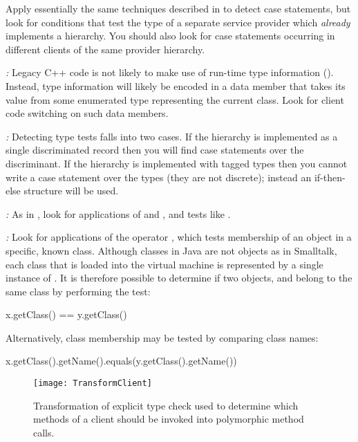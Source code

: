 \documentclass[a4paper,10pt,twoside]{book}
\begin{document}
Apply essentially the same techniques described in  to detect case statements, but look for conditions that test the type of a separate service provider which \emph{already} implements a hierarchy. You should also look for case statements occurring in different clients of the same provider hierarchy.

\begin{bulletlist}
\item \emph{:}
Legacy C++ code is not likely to make use of run-time type information (). Instead, type information will likely be encoded in a data member that takes its value from some enumerated type representing the current class. Look for client code switching on such data members.

\item \emph{:}
Detecting type tests falls into two cases. If the hierarchy is implemented as a single discriminated record then you will find case statements over the discriminant. If the hierarchy is implemented with tagged types then you cannot write a case statement over the types (they are not discrete); instead an if-then-else structure will be used.

\item \emph{:}
As in , look for applications of  and , and tests like .

\item \emph{:}
Look for applications of the operator , which tests membership of an object in a specific, known class. Although classes in Java are not objects as in Smalltalk, each class that is loaded into the virtual machine is represented by a single instance of . It is therefore possible to determine if two objects,  and  belong to the same class by performing the test:
\begin{code}
x.getClass() == y.getClass()
\end{code}
Alternatively, class membership may be tested by comparing class names:
\begin{code}
x.getClass().getName().equals(y.getClass().getName())
\end{code}

\end{bulletlist}

\begin{figure}[tb]
\begin{center}
\texttt{[image: TransformClient]}
\caption{Transformation of explicit type check used to determine which methods of a client should be invoked into polymorphic method calls.}
\end{center}
\end{figure}
\end{document}
